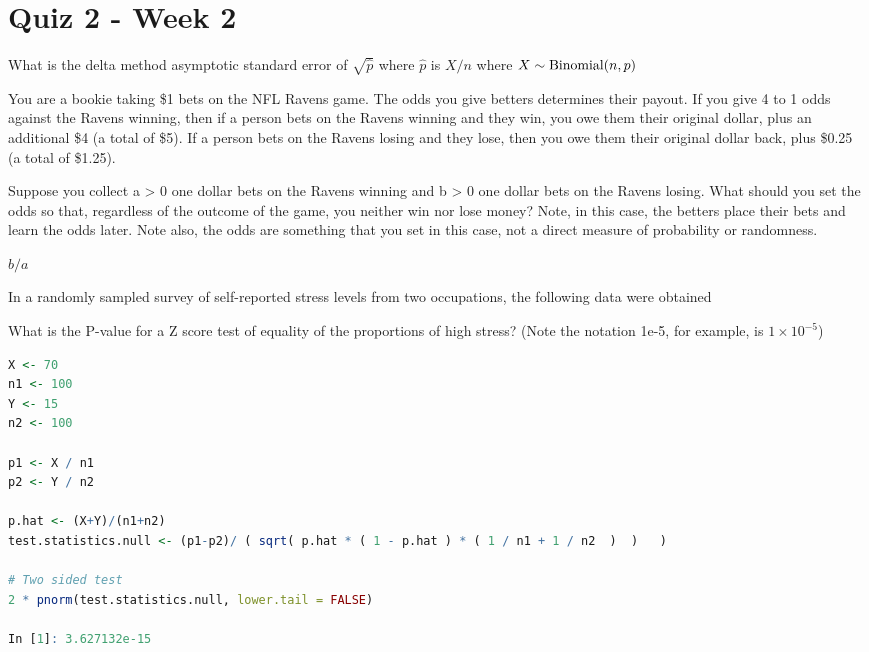 \documentclass{homework}
\begin{document}
\section{Quiz 2 - Week 2}

\begin{tcolorbox}[title=Question 1]
What is the delta method asymptotic standard error of $\sqrt{\hat p}$ where $\hat p$ is $X/n$ where $X \sim \textnormal{Binomial}(n, p)$
\end{tcolorbox}

\begin{tcolorbox}[title=Question 1]
You are a bookie taking \$1 bets on the NFL Ravens game. The odds you give betters determines their payout. If you give 4 to 1 odds against the Ravens winning, then if a person bets on the Ravens winning and they win, you owe them their original dollar, plus an additional \$4 (a total of \$5). If a person bets on the Ravens losing and they lose, then you owe them their original dollar back, plus \$0.25 (a total of \$1.25).

Suppose you collect a > 0 one dollar bets on the Ravens winning and b > 0 one dollar bets on the Ravens losing. What should you set the odds so that, regardless of the outcome of the game, you neither win nor lose money? Note, in this case, the betters place their bets and learn the odds later. Note also, the odds are something that you set in this case, not a direct measure of probability or randomness.
\end{tcolorbox}

$b/a$

\begin{tcolorbox}[title=Question 3]
In a randomly sampled survey of self-reported stress levels from two occupations, the following data were obtained


What is the P-value for a Z score test of equality of the proportions of high stress? (Note the notation 1e-5, for example, is $1\times 10^{-5}$)
\end{tcolorbox}

\begin{lstlisting}[language=R]
X <- 70
n1 <- 100
Y <- 15
n2 <- 100

p1 <- X / n1
p2 <- Y / n2

p.hat <- (X+Y)/(n1+n2)
test.statistics.null <- (p1-p2)/ ( sqrt( p.hat * ( 1 - p.hat ) * ( 1 / n1 + 1 / n2  )  )   )

# Two sided test
2 * pnorm(test.statistics.null, lower.tail = FALSE)

In [1]: 3.627132e-15
\end{lstlisting}
\end{document}
